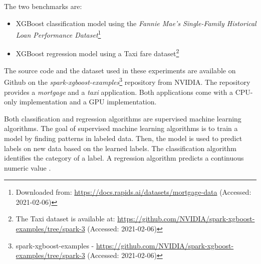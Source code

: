 The two benchmarks are:
\begin{itemize}
\item XGBoost classification model using the \textit{Fannie Mae’s Single-Family Historical Loan Performance Dataset}\footnote{Downloaded from: \url{https://docs.rapids.ai/datasets/mortgage-data} (Accessed: 2021-02-06)}\cite{Fannie2021Mortgage}

\item XGBoost regression model using a Taxi fare dataset\footnote{The Taxi dataset is available at: \url{https://github.com/NVIDIA/spark-xgboost-examples/tree/spark-3} (Accessed: 2021-02-06)}
\end{itemize}
The source code and the dataset used in these experiments are available on Github on the \textit{spark-xgboost-examples}\footnote{spark-xgboost-examples - \url{https://github.com/NVIDIA/spark-xgboost-examples/tree/spark-3} (Accessed: 2021-02-06)} repository from NVIDIA.
The repository provides a \textit{mortgage} and a \textit{taxi} application. Both applications come with a CPU-only implementation and a GPU implementation.

Both classification and regression algorithms are supervised machine learning algorithms.
The goal of supervised machine learning algorithms is to train a model by finding patterns in labeled data. Then, the model is used to predict labels on new data based on the learned labels.
The classification algorithm identifies the category of a label.
A regression algorithm predicts a continuous numeric value \cite{Mcdonald2020SparkRapids}.



